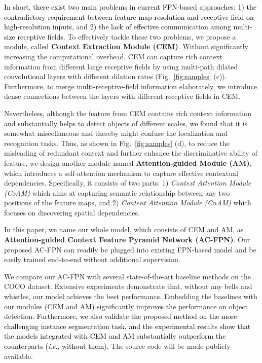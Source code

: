\documentclass[journal]{IEEEtran}
\newcommand{\ie}{\textit{i}.\textit{e}.\xspace}
\def\myblue{\textcolor{black}}
\begin{document}
	
	\myblue{In short, there exist two main problems in current FPN-based approaches: 1) the contradictory requirement between feature map resolution and receptive  field on high-resolution inputs, and 2) the lack of effective communication among multi-size receptive fields.}
To effectively tackle these two problems, we propose a module, called \textbf{Context Extraction Module (CEM)}.
	Without significantly increasing the computational overhead, CEM can capture rich context information from different large receptive fields by using multi-path dilated convolutional layers with different dilation rates (Fig.~\ref{fig:samples} (c)).
	Furthermore, to merge multi-receptive-field information elaborately, we introduce dense connections between the layers \myblue{with} different receptive fields in CEM.
	
	Nevertheless, although the feature from CEM contains rich context information and substantially helps to detect objects of different scales, we found that it is somewhat miscellaneous and thereby might confuse the localization and recognition tasks. Thus, as shown in Fig.~\ref{fig:samples} (d), to reduce the misleading of redundant context and further enhance the discriminative ability of feature, we design another module named \textbf{Attention-guided Module (AM)}, which introduces a self-attention mechanism to capture effective contextual dependencies. Specifically, it consists of two parts: 1) \textit{Context Attention Module (CxAM)} which aims at capturing semantic relationship between any two positions of the feature maps, and 2) \textit{Content Attention Module (CnAM)} which focuses on discovering spatial dependencies.
	
	In this paper, we name our whole model, which consists of CEM and AM, as \textbf{Attention-guided Context Feature Pyramid Network (AC-FPN)}. Our proposed AC-FPN can readily be plugged into existing FPN-based \myblue{model} and be easily trained end-to-end without additional supervision.




	We compare our AC-FPN with several state-of-the-art baseline methods on the COCO dataset. Extensive experiments demonstrate that, without any bells and whistles, our model achieves the best performance. Embedding the baselines with our modules (CEM and AM) significantly improves the performance on object detection. 
\myblue{Furthermore, we also validate the proposed method on the more challenging instance segmentation task, and the experimental results show that the models integrated with CEM and AM substantially outperform the counterparts (\ie, without them).}
	The source code will be made publicly available.
	
\end{document}
